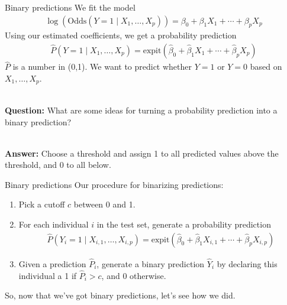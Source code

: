 \documentclass[10pt,t]{beamer}
\begin{document}
\begin{frame}{Binary predictions}
	We fit the model
	\begin{align*}
		\log(\text{Odds}(Y = 1 \mid X_1, \dots, X_p)) = \beta_0 + \beta_1X_1 + \cdots + \beta_pX_p
	\end{align*}\pause
	Using our estimated coefficients, we get a probability prediction
	\begin{align*}
		\widehat{P}(Y = 1 \mid X_1, \dots, X_p) = \text{expit}(\hat{\beta}_0 + \hat{\beta}_1X_1 + \cdots + \hat{\beta}_pX_p)
	\end{align*}\pause
	$\hat{P}$ is a number in (0,1). We want to predict whether $Y = 1$ or $Y = 0$ based on $X_1,\dots, X_p$.\pause
	\\ ~\ 
	
	\textbf{Question:} What are some ideas for turning a probability prediction into a binary prediction?\pause
	\\ ~\  
	
	\textbf{Answer:} Choose a threshold and assign 1 to all predicted values above the threshold, and 0 to all below. 
\end{frame}

\begin{frame}{Binary predictions}
	Our procedure for binarizing predictions:\pause
	\begin{enumerate}
		\item Pick a cutoff $c$ between 0 and 1.\pause
		\item For each individual $i$ in the test set, generate a probability prediction 
		\begin{align*}
			\widehat{P}(Y_i = 1 \mid X_{i,1}, \dots, X_{i,p}) = \text{expit}(\hat{\beta}_0 + \hat{\beta}_1X_{i,1} + \cdots + \hat{\beta}_pX_{i,p})
		\end{align*} \pause
		\item Given a prediction $\hat{P}_i$, generate a binary prediction $\hat{Y}_i$ by declaring this individual a 1 if $\hat{P}_i> c$, and 0 otherwise. \pause
	\end{enumerate}
	So, now that we've got binary predictions, let's see how we did. 
\end{frame}
\end{document}
